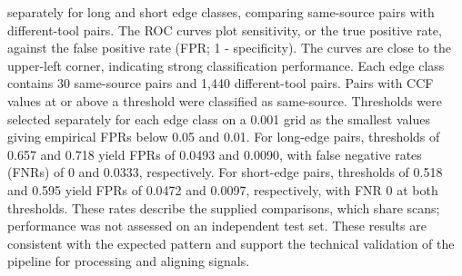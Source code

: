 \documentclass[11pt,a4paper]{article}
\begin{document}
separately for long and short edge classes, comparing same-source pairs
with different-tool pairs. The ROC curves plot sensitivity, or the true
positive rate, against the false positive rate (FPR; 1 - specificity).
The curves are close to the upper-left corner, indicating strong
classification performance. Each edge class contains 30 same-source
pairs and 1,440 different-tool pairs. Pairs with CCF values at or above
a threshold were classified as same-source. Thresholds were selected
separately for each edge class on a 0.001 grid as the smallest values
giving empirical FPRs below 0.05 and 0.01. For long-edge pairs,
thresholds of 0.657 and 0.718 yield FPRs of 0.0493 and 0.0090, with
false negative rates (FNRs) of 0 and 0.0333, respectively. For
short-edge pairs, thresholds of 0.518 and 0.595 yield FPRs of 0.0472 and
0.0097, respectively, with FNR 0 at both thresholds. These rates
describe the supplied comparisons, which share scans; performance was
not assessed on an independent test set. These results are consistent
with the expected pattern and support the technical validation of the
pipeline for processing and aligning signals.
\end{document}
